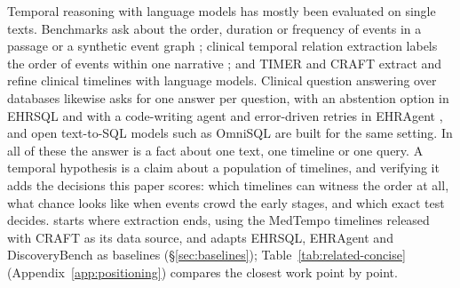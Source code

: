 Temporal reasoning with language models has mostly been evaluated on single
texts. Benchmarks ask about the order, duration or frequency of events in a
passage or a synthetic event graph \cite{wang2024tram,fatemi2025testoftime};
clinical temporal relation extraction labels the order of events within one
narrative \cite{sun2013i2b2,bethard2016clinicaltempeval}; and TIMER
\cite{timer2025} and CRAFT \cite{craft2026} extract and refine clinical
timelines with language models. Clinical question answering over databases
likewise asks for one answer per question, with an abstention option in
EHRSQL \cite{lee2022ehrsql} and with a code-writing agent and error-driven
retries in EHRAgent \cite{shi2024ehragent}, and open text-to-SQL models such
as OmniSQL \cite{li2025omnisql} are built for the same setting. In all of these the answer is a fact about one text,
one timeline or one query. A temporal hypothesis is a claim about a
population of timelines, and verifying it adds the decisions this paper
scores: which timelines can witness the order at all, what chance looks like
when events crowd the early stages, and which exact test decides. \sys{}
starts where extraction ends, using the MedTempo timelines released with
CRAFT as its data source, and adapts EHRSQL, EHRAgent and DiscoveryBench as
baselines (\S\ref{sec:baselines}); Table~\ref{tab:related-concise}
(Appendix~\ref{app:positioning}) compares the closest work point by point.

